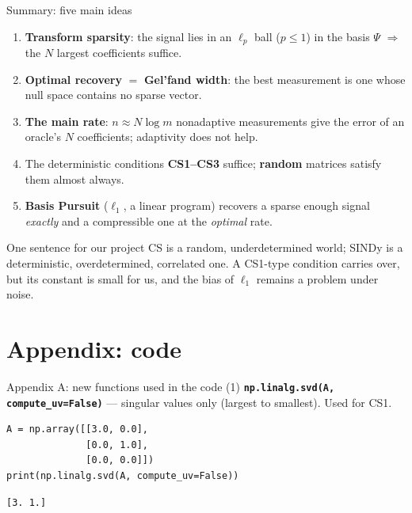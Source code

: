 \documentclass[aspectratio=169,11pt]{beamer}
\begin{document}
\begin{frame}{Summary: five main ideas}
  \begin{enumerate}
    \item \textbf{Transform sparsity}: the signal lies in an $\ell_p$ ball ($p\le1$) in the basis $\Psi$ $\Rightarrow$ the $N$ largest coefficients suffice.
    \item \textbf{Optimal recovery} $=$ \textbf{Gel'fand width}: the best measurement is one whose null space contains no sparse vector.
    \item \textbf{The main rate}: $n\approx N\log m$ nonadaptive measurements give the error of an oracle's $N$ coefficients; adaptivity does not help.
    \item The deterministic conditions \textbf{CS1--CS3} suffice; \textbf{random} matrices satisfy them almost always.
    \item \textbf{Basis Pursuit} ($\ell_1$, a linear program) recovers a sparse enough signal \emph{exactly} and a compressible one at the \emph{optimal} rate.
  \end{enumerate}
  \medskip
  \begin{alertblock}{One sentence for our project}
    CS is a random, underdetermined world; SINDy is a deterministic, overdetermined, correlated one. A CS1-type condition carries over,
    but its constant is small for us, and the bias of $\ell_1$ remains a problem under noise.
  \end{alertblock}
\end{frame}

\appendix
\section*{Appendix: code}

\begin{frame}[fragile]{Appendix A: new functions used in the code (1)}
  {\small\textbf{\texttt{np.linalg.svd(A, compute\_uv=False)}} --- singular values only (largest to smallest). Used for CS1.}
\begin{lstlisting}
A = np.array([[3.0, 0.0],
              [0.0, 1.0],
              [0.0, 0.0]])
print(np.linalg.svd(A, compute_uv=False))
\end{lstlisting}
\begin{lstlisting}
[3. 1.]
\end{lstlisting}
\end{frame}
\end{document}
